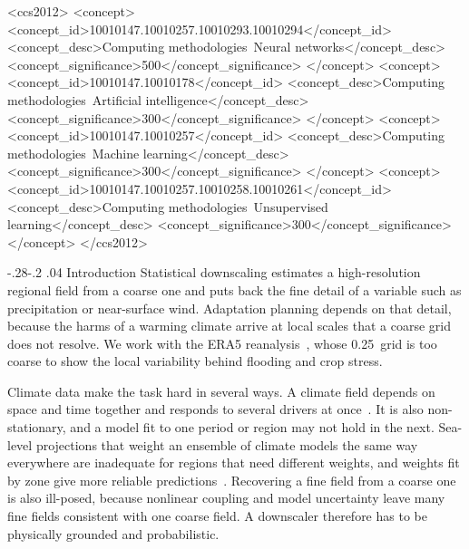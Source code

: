 \documentclass[sigconf,nonacm]{acmart}
\makeatletter
\renewcommand\section{\def\@toclevel{1}%
  \@startsection{section}{1}{\z@}%
  {-.28\baselineskip \@plus -1\p@ \@minus -.2\p@}%
  {.04\baselineskip}%
  {\ACM@NRadjust\@secfont}}
\makeatother
\begin{document}
\begin{CCSXML}
<ccs2012>
   <concept>
       <concept_id>10010147.10010257.10010293.10010294</concept_id>
       <concept_desc>Computing methodologies~Neural networks</concept_desc>
       <concept_significance>500</concept_significance>
       </concept>
   <concept>
       <concept_id>10010147.10010178</concept_id>
       <concept_desc>Computing methodologies~Artificial intelligence</concept_desc>
       <concept_significance>300</concept_significance>
       </concept>
   <concept>
       <concept_id>10010147.10010257</concept_id>
       <concept_desc>Computing methodologies~Machine learning</concept_desc>
       <concept_significance>300</concept_significance>
       </concept>
   <concept>
       <concept_id>10010147.10010257.10010258.10010261</concept_id>
       <concept_desc>Computing methodologies~Unsupervised learning</concept_desc>
       <concept_significance>300</concept_significance>
       </concept>
 </ccs2012>
\end{CCSXML}



\maketitle

\section{Introduction}
\label{sec:intro}
Statistical downscaling estimates a high-resolution regional field from a coarse one and puts back the fine detail of a variable such as precipitation or near-surface wind. Adaptation planning depends on that detail, because the harms of a warming climate arrive at local scales that a coarse grid does not resolve. We work with the ERA5 reanalysis~\citep{hersbach2020era5}, whose 0.25\textdegree\ grid is too coarse to show the local variability behind flooding and crop stress.

Climate data make the task hard in several ways. A climate field depends on space and time together and responds to several drivers at once~\citep{sharma2022spatiotemporal}. It is also non-stationary, and a model fit to one period or region may not hold in the next. Sea-level projections that weight an ensemble of climate models the same way everywhere are inadequate for regions that need different weights, and weights fit by zone give more reliable predictions~\citep{ghosh2023reducing}. Recovering a fine field from a coarse one is also ill-posed, because nonlinear coupling and model uncertainty leave many fine fields consistent with one coarse field. A downscaler therefore has to be physically grounded and probabilistic.
\end{document}
